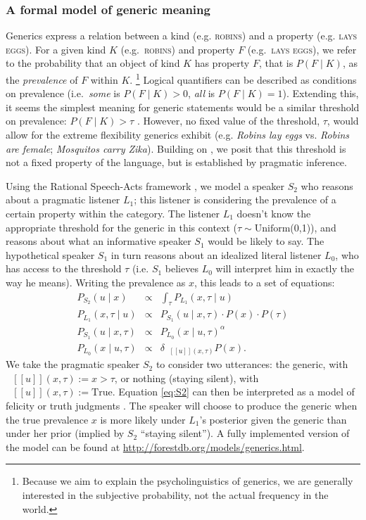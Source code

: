 \documentclass[11pt,letterpaper]{article}
\newcommand{\denote}[1]{\mbox{ $[\![ #1 ]\!]$}}
\begin{document}
\subsubsection*{A formal model of generic meaning}

Generics express a relation between a kind (e.g. \textsc{robins}) and a property (e.g. \textsc{lays eggs}). 
For a given kind $K$ (e.g.~\textsc{robins}) and property $F$ (e.g.~\textsc{lays eggs}), we refer to the probability that an object of kind $K$ has property $F$, that is $P(F\mid K)$, as the \emph{prevalence} of $F$ within $K$.
\footnote{Because we aim to explain the psycholinguistics of generics, we are generally interested in the subjective probability, not the actual frequency in the world.}
Logical quantifiers can be described as conditions on prevalence (i.e.~\emph{some} is $P(F\mid K)>0$, \emph{all} is $P(F\mid K)=1$). 
Extending this, it seems the simplest meaning for generic statements would be a similar threshold on prevalence: $P(F\mid K)>\tau$ \cite{Cohen1999}. 
However, no fixed value of the threshold, $\tau$, would allow for the extreme flexibility generics exhibit (e.g. \emph{Robins lay eggs} vs. \emph{Robins are female}; \emph{Mosquitos carry Zika}).
Building on , we posit that this threshold is not a fixed property of the language, but is established by pragmatic inference.

Using the Rational Speech-Acts framework \cite{Frank2012,Goodman2013}, 
we model a speaker $S_2$ who reasons about a pragmatic listener $L_1$; this listener is considering the prevalence of a certain property within the category.
The listener $L_1$ doesn't know the appropriate threshold for the generic in this context ($\tau \sim \text{Uniform}$(0,1)), and reasons about what an informative speaker $S_1$ would be likely to say. The hypothetical speaker $S_1$ in turn reasons about an idealized literal listener $L_0$, who has access to the threshold $\tau$ (i.e. $S_1$ believes $L_0$ will interpret him in exactly the way he means). 
Writing the prevalence as $x$, this leads to a set of equations:
%
\begin{eqnarray}
P_{S_{2}}(u \mid x) & \propto &  \int_{\tau} P_{L_{1}}(x , \tau \mid u) \label{eq:S2}\\
P_{L_{1}}(x , \tau \mid u) &\propto& P_{S_{1}}(u \mid x, \tau) \cdot P(x) \cdot P(\tau) \label{eq:L1}\\
P_{S_{1}}(u \mid x, \tau) &\propto&  {P_{L_{0}}(x \mid u, \tau)}^{\alpha} \label{eq:S1}\\
P_{L_{0}}(x \mid u, \tau) &\propto& {\delta_{\denote{u}(x, \tau)} P(x)}. \label{eq:L0}
\end{eqnarray}
%
We take the pragmatic speaker $S_2$ to consider two utterances: the generic, with $\denote{u}(x, \tau) := x>\tau$, or nothing (staying silent), with $\denote{u}(x, \tau) := \text{True}$.
Equation \ref{eq:S2} can then be interpreted as a model of felicity or truth judgments \cite{Degen2014}.
The speaker will choose to produce the generic when the true prevalence $x$ is more likely under $L_1$'s posterior given the generic than under her prior (implied by $S_2$ ``staying silent''). 
A fully implemented version of the model can be found at \url{http://forestdb.org/models/generics.html}.
\end{document}
